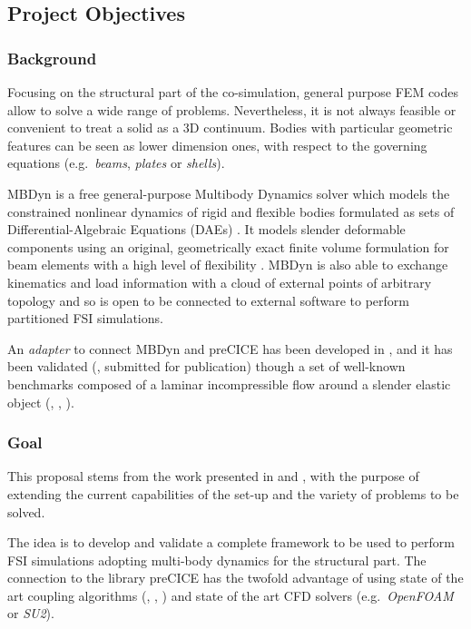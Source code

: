 \subsection*{Project Objectives}


\subsubsection*{Background}

Focusing on the structural part of the co-simulation, general purpose FEM codes allow to solve a wide range of problems. Nevertheless, it is not always feasible or convenient to treat a solid as a 3D continuum. Bodies with particular geometric features can be seen as lower dimension ones, with respect to the governing equations \cite{hjelmstad2007fundamentals} (e.g.\ \textit{beams}, \textit{plates} or \textit{shells}).

MBDyn is a free general-purpose Multibody Dynamics solver which models the constrained nonlinear dynamics of rigid and flexible bodies formulated as sets of Differential-Algebraic Equations (DAEs) \cite{masarati2014efficient}. It models slender deformable components using an original, geometrically exact finite volume formulation for beam elements with a high level of flexibility \cite{ghiringhelli2000multibody,bauchau2016validation}. MBDyn is also able to exchange kinematics and load information with a cloud of external points of arbitrary topology \cite{quaranta2005conservative} and so is open to be connected to external software to perform partitioned FSI simulations.

An \textit{adapter} to connect MBDyn and preCICE has been developed in \cite{caccia2020master}, and it has been validated (\cite{caccia2021coupling}, submitted for publication) though a set of well-known benchmarks composed of a laminar incompressible flow around a slender elastic object (\cite{ramm1998fluid}, \cite{turek2006proposal}, \cite{turek2010numerical}).

\subsubsection*{Goal}

This proposal stems from the work presented in \cite{caccia2020master} and \cite{caccia2021coupling}, with the purpose of extending the current capabilities of the set-up and the variety of problems to be solved.

The idea is to develop and validate a complete framework to be used to perform FSI simulations adopting multi-body dynamics for the structural part. The connection to the library preCICE has the twofold advantage of using state of the art coupling algorithms (\cite{mehl2016parallel}, \cite{bungartz2016precice}, \cite{degroote2009performance}) and state of the art CFD solvers \cite{uekermann2017official} (e.g.\ \textit{OpenFOAM} or \textit{SU2}).

